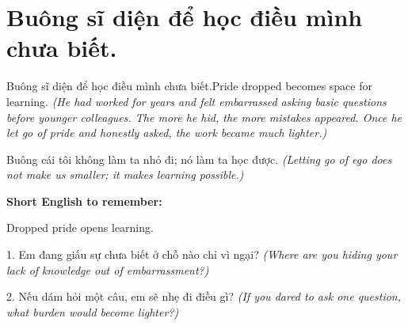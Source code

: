 \section{Buông sĩ diện để học điều mình chưa biết.}
\begin{truyen}{Buông sĩ diện để học điều mình chưa biết.}{Pride dropped becomes space for learning.}
\textit{(He had worked for years and felt embarrassed asking basic questions before younger colleagues. The more he hid, the more mistakes appeared. Once he let go of pride and honestly asked, the work became much lighter.)}
\end{truyen}
\begin{baihoc}
Buông cái tôi không làm ta nhỏ đi; nó làm ta học được.
\textit{(Letting go of ego does not make us smaller; it makes learning possible.)}
\end{baihoc}
\begin{ghinhoanh}
\textbf{Short English to remember:}

Dropped pride opens learning.
\end{ghinhoanh}
\begin{tuhocnhanh}
1. Em đang giấu sự chưa biết ở chỗ nào chỉ vì ngại? \textit{(Where are you hiding your lack of knowledge out of embarrassment?)}

2. Nếu dám hỏi một câu, em sẽ nhẹ đi điều gì? \textit{(If you dared to ask one question, what burden would become lighter?)}
\end{tuhocnhanh}
\ngancach

